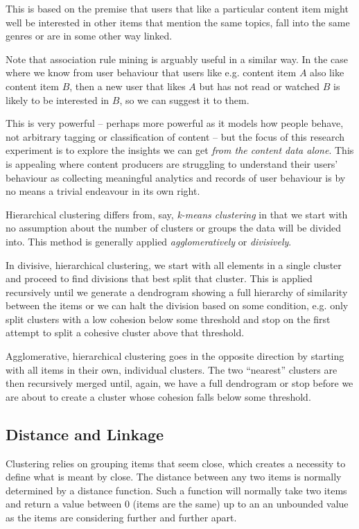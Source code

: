 This is based on the premise that users that like a particular
content item might well be interested in other items that mention
the same topics, fall into the same genres or are in some other
way linked.

Note that association rule mining is arguably useful in a similar way.
In the case where we know from user behaviour that users like e.g.
content item $A$ also like content item $B$, then a new user that
likes $A$ but has not read or watched $B$ is likely to be interested
in $B$, so we can suggest it to them.

This is very powerful -- perhaps more powerful as it models how
people behave, not arbitrary tagging or classification of content --
but the focus of this research experiment is to explore the insights
we can get \emph{from the content data alone}. This is appealing
where content producers are struggling to understand their users'
behaviour as collecting meaningful analytics and records of user
behaviour is by no means a trivial endeavour in its own right.

Hierarchical clustering differs from, say,
\emph{k-means clustering}\cite{witten2005data} in that
we start with no assumption about the number of clusters or groups
the data will be divided into. This method is generally applied
\emph{agglomeratively} or \emph{divisively}.

In divisive, hierarchical clustering, we start with all elements in
a single cluster and proceed to find divisions that best split that
cluster. This is applied recursively until we generate a
dendrogram\cite{witten2005data} showing a full hierarchy of similarity
between the items or we can halt the division based on some condition,
e.g. only split clusters with a low cohesion below some threshold
and stop on the first attempt to split a cohesive cluster above
that threshold.

Agglomerative, hierarchical clustering goes in the opposite direction
by starting with all items in their own, individual clusters.
The two ``nearest'' clusters are then recursively merged until, again,
we have a full dendrogram or stop before we are about to create a
cluster whose cohesion falls below some threshold.

\subsection{Distance and Linkage}

Clustering relies on grouping items that seem close, which creates
a necessity to define what is meant by close. The distance between
any two items is normally determined by a distance
function.\cite{witten2005data} Such a function will normally take
two items and return a value between 0 (items are the same) up to an
an unbounded value as the items are considering further and further
apart.

